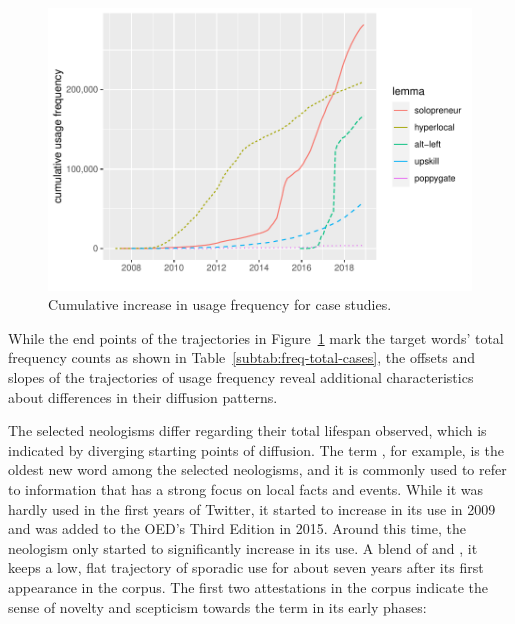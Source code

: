 \documentclass[
  a4paper,
  abstract=on,
  captions=tableabove
  ]{scrartcl}
\begin{document}
      \begin{figure}
        \caption[Cumulative increase in usage frequency]{Cumulative increase in usage frequency for case studies.\protect\footnotemark}
        \label{fig:freq_cum_cases}
        \centering
        \includegraphics[width=.8\linewidth]{img/freq_cum_cases.pdf}
      \end{figure}

      While the end points of the trajectories in Figure~\ref{fig:freq_cum_cases} mark the target words' total frequency counts as shown in Table~\ref{subtab:freq-total-cases}, the offsets and slopes of the trajectories of usage frequency reveal additional characteristics about differences in their diffusion patterns.



      The selected neologisms differ regarding their total lifespan observed, which is indicated by diverging starting points of diffusion. The term , for example, is the oldest new word among the selected neologisms, and it is commonly used to refer to information that has a strong focus on local facts and events. While it was hardly used in the first years of Twitter, it started to increase in its use in 2009 and was added to the OED's Third Edition in 2015. Around this time, the neologism  only started to significantly increase in its use. A blend of  and , it keeps a low, flat trajectory of sporadic use for about seven years after its first appearance in the corpus. The first two attestations in the corpus indicate the sense of novelty and scepticism towards the term in its early phases:
\end{document}
